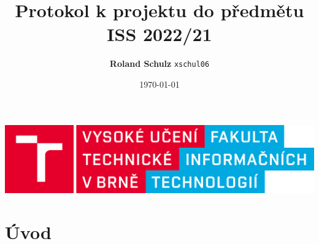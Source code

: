 \documentclass[11pt,a4paper]{article}
\author{
        \textbf{Roland Schulz} \texttt{xschul06}
        }
\title{
       {\Huge\textbf{Protokol k projektu do předmětu ISS 2022/21}} \\ 
       }
\date{}
\begin{document}
   \begin{titlepage}
   \begin{center}
            {\includegraphics[width = \textwidth]{img/VUT-FIT-logo-cs.png}}
            {\let\newpage\relax\maketitle}
            \thispagestyle{empty}
            \vspace{\fill}
            \date{\today}
        \end{center}
    \end{titlepage}

\tableofcontents
\newpage

\section{Úvod}
\end{document}
